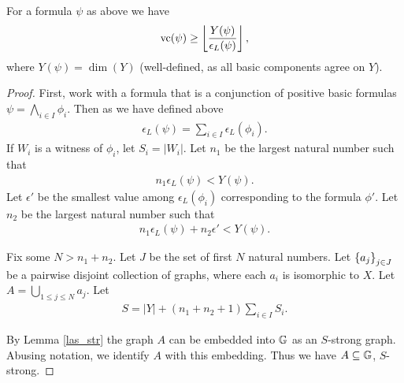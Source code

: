 \begin{Theorem} \label{main_lower}
  For a formula $\psi$ as above we have
  \begin{align*}
    \operatorname{vc} (\psi) \geq \left \lfloor \frac{Y(\psi)}{\epsilon_L(\psi)} \right \rfloor,
  \end{align*}
  where $Y(\psi) = \dim(Y)$ (well-defined, as all basic components agree on $Y$).
\end{Theorem}
\begin{proof}
  First, work with a formula that is a conjunction of positive basic formulas $\psi = \bigwedge_{i \in I} \phi_i$.
  Then as we have defined above
  \begin{align*}
    \epsilon_L(\psi) = \sum_{i \in I} \epsilon_L(\phi_i).
  \end{align*}
  If $W_i$ is a witness of $\phi_i$, let $S_i = |W_i|$.
  Let $n_1$ be the largest natural number such that
  \begin{align*}
    n_1 \epsilon_L(\psi) < Y(\psi).
  \end{align*}
  Let $\epsilon'$ be the smallest value among $\epsilon_L(\phi_i)$ corresponding to the formula $\phi'$.
  Let $n_2$ be the largest natural number such that
  \begin{align*}
    n_1 \epsilon_L(\psi) + n_2 \epsilon' < Y(\psi).
  \end{align*}

  Fix some $N > n_1 + n_2$.
  Let $J$ be the set of first $N$ natural numbers. 
  Let $\left\{a_j\right\}_{j \in J}$ be a pairwise disjoint collection of graphs, where each $a_i$ is isomorphic to $X$.
  Let $A = \bigcup_{1 \leq j \leq N} a_j$.
  Let 
  \begin{align*}
    S = |Y| + (n_1 + n_2 + 1) \sum_{i \in I} S_i.
  \end{align*}

  By Lemma \ref{las_str} the graph $A$ can be embedded into $\mathbb G$ as an $S$-strong graph. 
  Abusing notation, we identify $A$ with this embedding.
  Thus we have $A \subseteq \mathbb G$, $S$-strong. 


\end{proof}
